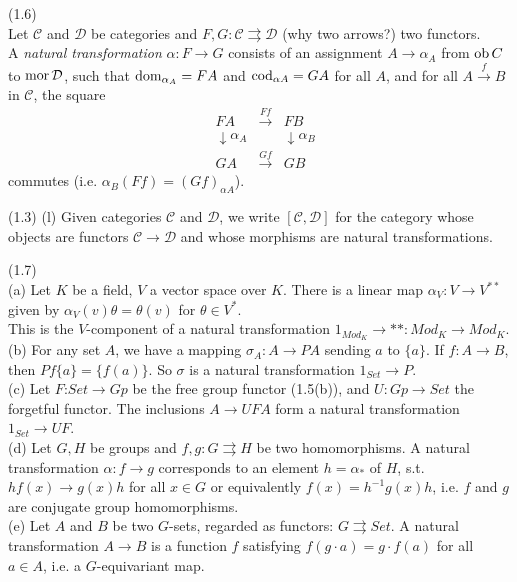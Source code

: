 \documentclass[a4paper]{article}
\begin{document}
\begin{defi} (1.6)\\
    Let $\mathcal{C}$ and $\mathcal{D}$ be categories and $F, G: \mathcal{C}\rightrightarrows \mathcal{D}$ (why two arrows?) two functors.\\
    A \emph{natural transformation} $\alpha:F \to G$ consists of an assignment $A \to \alpha_A$ from $\operatorname{ob} C$ to $\operatorname{mor} \mathcal{D}$, such that $\operatorname{dom}_{\alpha_A} = FA$ and $\operatorname{cod}_{\alpha A} = G A$ for all $A$, and for all $A \xrightarrow{f} B$ in $\mathcal{C}$, the square 
    \begin{equation*}
        \begin{aligned}
            &FA &\xrightarrow{Ff} &FB\\
            &\downarrow \alpha_A & &\downarrow \alpha_B\\
            &GA &\xrightarrow{Gf} & GB
        \end{aligned}
    \end{equation*}
    commutes (i.e. $\alpha_B(Ff) = (Gf)_{\alpha A}$).
\end{defi}

(1.3) (l) Given categories $\mathcal{C}$ and $\mathcal{D}$, we write $[\mathcal{C},\mathcal{D}]$ for the category whose objects are functors $\mathcal{C} \to \mathcal{D}$ and whose morphisms are natural transformations.

\begin{eg} (1.7)\\
    (a) Let $K$ be a field, $V$ a vector space over $K$. There is a linear map $\alpha_V : V \to V^{**}$ given by $\alpha_V (v) \theta = \theta(v)$ for $\theta \in V^*$.\\
    This is the $V$-component of a natural transformation $1_{Mod_K} \to **: Mod_K \to Mod_K$.\\
    (b) For any set $A$, we have a mapping $\sigma_A:A \to PA$ sending $a$ to $\{a\}$. If $f:A \to B$, then $Pf\{a\} = \{f(a)\}$. So $\sigma$ is a natural transformation $1_{Set} \to P$.\\
    (c) Let $F$:$Set \to Gp$ be the free group functor (1.5(b)), and $U: Gp \to Set$ the forgetful functor. The inclusions $A \to UFA$ form a natural transformation $1_{Set} \to UF$.\\
    (d) Let $G,H$ be groups and $f,g: G \rightrightarrows H$ be two homomorphisms. A natural transformation $\alpha: f \to g$ corresponds to an element $h=\alpha_*$ of $H$, s.t. $h f(x) \to g(x) h$ for all $x \in G$ or equivalently $f(x) = h^{-1} g(x) h$, i.e. $f$ and $g$ are conjugate group homomorphisms.\\
    (e) Let $A$ and $B$ be two $G$-sets, regarded as functors: $G \rightrightarrows Set$. A natural transformation $A \to B$ is a function $f$ satisfying $f(g\cdot a) = g \cdot f(a)$ for all $a \in A$, i.e. a $G$-equivariant map.
\end{eg}
\end{document}
